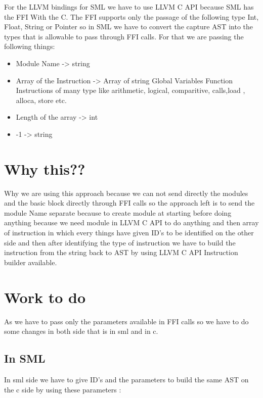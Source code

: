 \documentclass{book}
\begin{document}
For the LLVM bindings for SML we have to use LLVM C API because SML has the FFI With the C. The FFI supports only the passage of the following type Int, Float, String or Pointer so in SML we have to convert the capture AST into the types that is allowable to pass through FFI calls. For that we are passing the following things: \newpage

\begin{itemize}
	\item Module Name  -> string
	\item Array of the Instruction -> Array of string
	\subitem Global Variables   
	\subitem Function 
	\subitem Instructions of many type like arithmetic, logical, comparitive, calls,load , alloca, store etc.
	\item Length of the array -> int 
	\item -1 -> string 
\end{itemize}
	
\section{Why this??}
Why we are using this approach because we can not send directly the modules and the basic block directly through FFI calls so the approach left is to send the module Name separate because to create module at starting before doing anything because we need module in LLVM C API to do anything and then array of instruction in which every things have given ID's to be identified on the other side and then after identifying the type of instruction we have to build the instruction from the string back to AST by using LLVM C API Instruction builder available.

\section{Work to do}
As we have to pass only the parameters available in FFI calls so we have to do some changes in both side that is in sml and in c.

\subsection{In SML}
In sml side we have to give ID's and the parameters to build the same AST on the c side by using these parameters :\newpage
\end{document}
